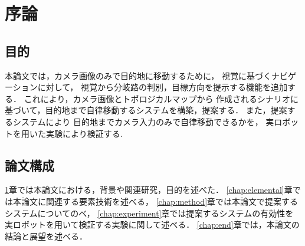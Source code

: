 \chapter{序論}
\label{chap:introduction}
%
%
%

%
% 
\newpage

\newpage
\section{目的}
本論文では，カメラ画像のみで目的地に移動するために，
視覚に基づくナビゲーションに対して，
視覚から分岐路の判別，目標方向を提示する機能を追加する．
これにより，カメラ画像とトポロジカルマップから
作成されるシナリオに基づいて，目的地まで自律移動するシステムを構築，提案する．
また，提案するシステムにより
目的地までカメラ入力のみで自律移動できるかを，
実ロボットを用いた実験により検証する.

\section{論文構成}
\ref{chap:introduction}章では本論文における，背景や関連研究，目的を述べた．
\ref{chap:elemental}章では本論文に関連する要素技術を述べる，
\ref{chap:method}章では本論文で提案するシステムについてのべ，
\ref{chap:experiment}章では提案するシステムの有効性を
実ロボットを用いて検証する実験に関して述べる．
\ref{chap:end}章では，本論文の結論と展望を述べる．